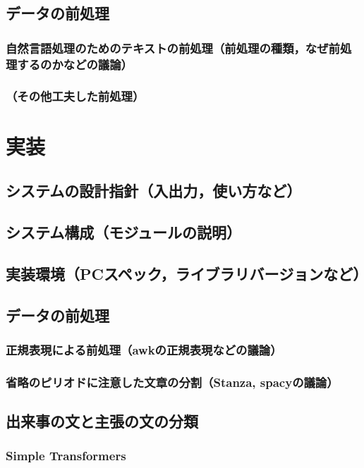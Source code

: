 \documentclass[12pt,a4j]{jreport}
\begin{document}
\section{データの前処理}
    \subsection{自然言語処理のためのテキストの前処理（前処理の種類，なぜ前処理するのかなどの議論）}
    \subsection{（その他工夫した前処理）}


\chapter{実装}

\section{システムの設計指針（入出力，使い方など）}
\section{システム構成（モジュールの説明）}
\section{実装環境（PCスペック，ライブラリバージョンなど）}
\section{データの前処理}
    \subsection{正規表現による前処理（awkの正規表現などの議論）}
    \subsection{省略のピリオドに注意した文章の分割（Stanza, spacyの議論）}
\section{出来事の文と主張の文の分類}
    \subsection{Simple Transformers}
\end{document}
